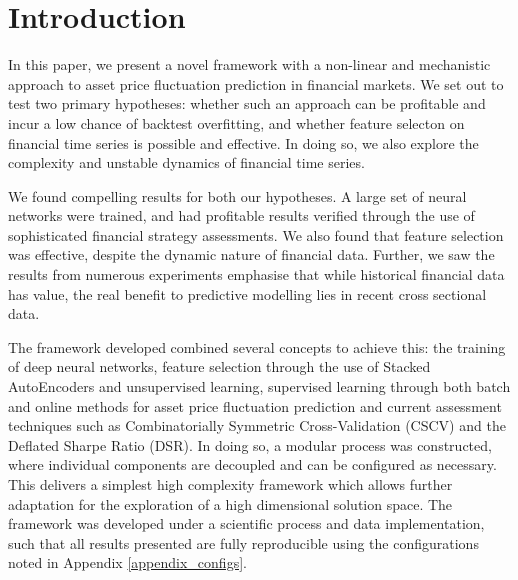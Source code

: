 \documentclass[a4paper,11pt,oneside]{article}
\theoremstyle{plain}
\theoremstyle{definition}
\begin{document}
	\newpage
	
	
	\section{Introduction}\label{Introduction}
	
	
	In this paper, we present a novel framework with a non-linear and mechanistic approach to asset price fluctuation prediction in financial markets. We set out to test two primary hypotheses: whether such an approach can be profitable and incur a low chance of backtest overfitting, and whether feature selecton on financial time series is possible and effective. In doing so, we also explore the complexity and unstable dynamics of financial time series.\newline
	
	We found compelling results for both our hypotheses. A large set of neural networks were trained, and had profitable results verified through the use of sophisticated financial strategy assessments. We also found  that feature selection was effective, despite the dynamic nature of financial data. Further, we saw the results from numerous experiments emphasise that while historical financial data has value, the real benefit to predictive modelling lies in recent cross sectional data.\newline

	The framework developed combined several concepts to achieve this: the training of deep neural networks, feature selection through the use of Stacked AutoEncoders and unsupervised learning, supervised learning through both batch and online methods for asset price fluctuation prediction and current assessment techniques such as Combinatorially Symmetric Cross-Validation (CSCV) and the Deflated Sharpe Ratio (DSR). In doing so, a modular process was constructed, where individual components are decoupled and can be configured as necessary. This delivers a simplest high complexity framework which allows further adaptation for the exploration of a high dimensional solution space. The framework was developed under a scientific process and data implementation, such that all results presented are fully reproducible using the configurations noted in Appendix \ref{appendix_configs}.\newline
\end{document}
